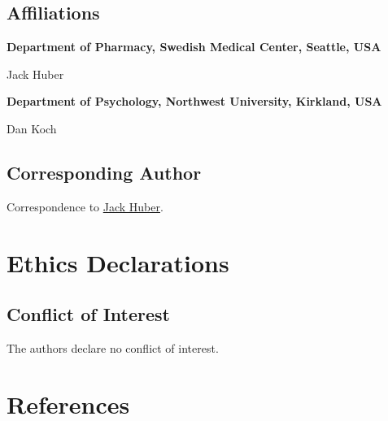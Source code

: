 \documentclass[
  letterpaper,
  DIV=11,
  numbers=noendperiod]{scrreport}
\begin{document}
\hypertarget{affiliations}{%
\section*{Affiliations}\label{affiliations}}

\textbf{Department of Pharmacy, Swedish Medical Center, Seattle, USA}

Jack Huber

\textbf{Department of Psychology, Northwest University, Kirkland, USA}

Dan Koch

\hypertarget{corresponding-author}{%
\section*{Corresponding Author}\label{corresponding-author}}

Correspondence to \href{mailto:jack.bernard.huber@gmail.com}{Jack
Huber}.


\hypertarget{ethics-declarations}{%
\chapter*{Ethics Declarations}\label{ethics-declarations}}

\hypertarget{conflict-of-interest}{%
\section*{Conflict of Interest}\label{conflict-of-interest}}

The authors declare no conflict of interest.


\hypertarget{references}{%
\chapter*{References}\label{references}}
\end{document}
